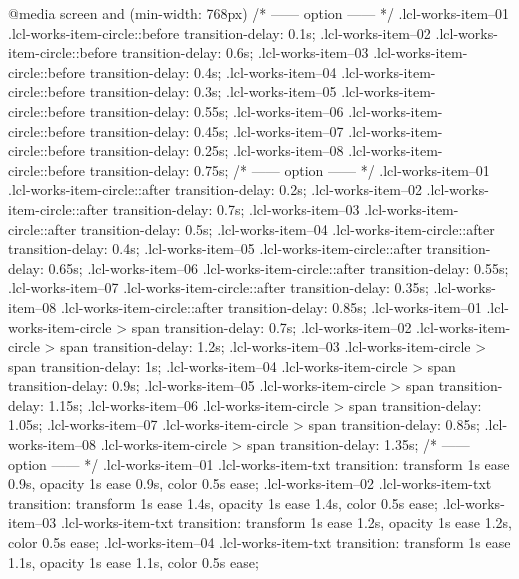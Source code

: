 @media screen and (min-width: 768px) {
	/* ------ option ------ */
	.lcl-works-item--01 .lcl-works-item-circle::before {
		transition-delay: 0.1s;
	}
	.lcl-works-item--02 .lcl-works-item-circle::before {
		transition-delay: 0.6s;
	}
	.lcl-works-item--03 .lcl-works-item-circle::before {
		transition-delay: 0.4s;
	}
	.lcl-works-item--04 .lcl-works-item-circle::before {
		transition-delay: 0.3s;
	}
	.lcl-works-item--05 .lcl-works-item-circle::before {
		transition-delay: 0.55s;
	}
	.lcl-works-item--06 .lcl-works-item-circle::before {
		transition-delay: 0.45s;
	}
	.lcl-works-item--07 .lcl-works-item-circle::before {
		transition-delay: 0.25s;
	}
	.lcl-works-item--08 .lcl-works-item-circle::before {
		transition-delay: 0.75s;
	}
	/* ------ option ------ */
	.lcl-works-item--01 .lcl-works-item-circle::after {
		transition-delay: 0.2s;
	}
	.lcl-works-item--02 .lcl-works-item-circle::after {
		transition-delay: 0.7s;
	}
	.lcl-works-item--03 .lcl-works-item-circle::after {
		transition-delay: 0.5s;
	}
	.lcl-works-item--04 .lcl-works-item-circle::after {
		transition-delay: 0.4s;
	}
	.lcl-works-item--05 .lcl-works-item-circle::after {
		transition-delay: 0.65s;
	}
	.lcl-works-item--06 .lcl-works-item-circle::after {
		transition-delay: 0.55s;
	}
	.lcl-works-item--07 .lcl-works-item-circle::after {
		transition-delay: 0.35s;
	}
	.lcl-works-item--08 .lcl-works-item-circle::after {
		transition-delay: 0.85s;
	}
	.lcl-works-item--01 .lcl-works-item-circle > span {
		transition-delay: 0.7s;
	}
	.lcl-works-item--02 .lcl-works-item-circle > span {
		transition-delay: 1.2s;
	}
	.lcl-works-item--03 .lcl-works-item-circle > span {
		transition-delay: 1s;
	}
	.lcl-works-item--04 .lcl-works-item-circle > span {
		transition-delay: 0.9s;
	}
	.lcl-works-item--05 .lcl-works-item-circle > span {
		transition-delay: 1.15s;
	}
	.lcl-works-item--06 .lcl-works-item-circle > span {
		transition-delay: 1.05s;
	}
	.lcl-works-item--07 .lcl-works-item-circle > span {
		transition-delay: 0.85s;
	}
	.lcl-works-item--08 .lcl-works-item-circle > span {
		transition-delay: 1.35s;
	}
	/* ------ option ------ */
	.lcl-works-item--01 .lcl-works-item-txt {
		transition: transform 1s ease 0.9s, opacity 1s ease 0.9s,
			color 0.5s ease;
	}
	.lcl-works-item--02 .lcl-works-item-txt {
		transition: transform 1s ease 1.4s, opacity 1s ease 1.4s,
			color 0.5s ease;
	}
	.lcl-works-item--03 .lcl-works-item-txt {
		transition: transform 1s ease 1.2s, opacity 1s ease 1.2s,
			color 0.5s ease;
	}
	.lcl-works-item--04 .lcl-works-item-txt {
		transition: transform 1s ease 1.1s, opacity 1s ease 1.1s,
			color 0.5s ease;
}}
